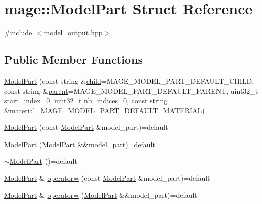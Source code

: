 \hypertarget{structmage_1_1_model_part}{}\section{mage\+:\+:Model\+Part Struct Reference}
\label{structmage_1_1_model_part}


{\ttfamily \#include $<$model\+\_\+output.\+hpp$>$}

\subsection*{Public Member Functions}
\begin{DoxyCompactItemize}
\item 
\hyperlink{structmage_1_1_model_part_a2c0dcbc96147ae6e059c72ca908aeb75}{Model\+Part} (const string \&\hyperlink{structmage_1_1_model_part_a3ab6e2faae44453d60cf0ff4876f49eb}{child}=M\+A\+G\+E\+\_\+\+M\+O\+D\+E\+L\+\_\+\+P\+A\+R\+T\+\_\+\+D\+E\+F\+A\+U\+L\+T\+\_\+\+C\+H\+I\+LD, const string \&\hyperlink{structmage_1_1_model_part_abd5387d6a21aa47bce04565c5333f83e}{parent}=M\+A\+G\+E\+\_\+\+M\+O\+D\+E\+L\+\_\+\+P\+A\+R\+T\+\_\+\+D\+E\+F\+A\+U\+L\+T\+\_\+\+P\+A\+R\+E\+NT, uint32\+\_\+t \hyperlink{structmage_1_1_model_part_af889f5bd847555d544d0ee07187e0115}{start\+\_\+index}=0, uint32\+\_\+t \hyperlink{structmage_1_1_model_part_a4b7d8beddffa117e1f6829e6c9acfce3}{nb\+\_\+indices}=0, const string \&\hyperlink{structmage_1_1_model_part_a4b0bfbb9ac313b6ffe8a8a3ee27469fd}{material}=M\+A\+G\+E\+\_\+\+M\+O\+D\+E\+L\+\_\+\+P\+A\+R\+T\+\_\+\+D\+E\+F\+A\+U\+L\+T\+\_\+\+M\+A\+T\+E\+R\+I\+AL)
\item 
\hyperlink{structmage_1_1_model_part_a3c39c2c312f07687f8ad5c2c2580d1e2}{Model\+Part} (const \hyperlink{structmage_1_1_model_part}{Model\+Part} \&model\+\_\+part)=default
\item 
\hyperlink{structmage_1_1_model_part_af8744793e9e6eccd59211c87ffc8e745}{Model\+Part} (\hyperlink{structmage_1_1_model_part}{Model\+Part} \&\&model\+\_\+part)=default
\item 
\hyperlink{structmage_1_1_model_part_a3322c5c7924ec30be170ae1ed6dca550}{$\sim$\+Model\+Part} ()=default
\item 
\hyperlink{structmage_1_1_model_part}{Model\+Part} \& \hyperlink{structmage_1_1_model_part_a37e9d66b701ed84111160bf5a003b658}{operator=} (const \hyperlink{structmage_1_1_model_part}{Model\+Part} \&model\+\_\+part)=default
\item 
\hyperlink{structmage_1_1_model_part}{Model\+Part} \& \hyperlink{structmage_1_1_model_part_a8337b8034d9a43514690a2db3d0f43c7}{operator=} (\hyperlink{structmage_1_1_model_part}{Model\+Part} \&\&model\+\_\+part)=default
\end{DoxyCompactItemize}
